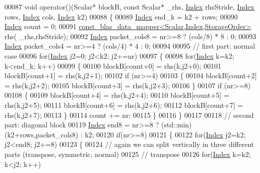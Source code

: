 \begin{DoxyCode}
00087   \textcolor{keywordtype}{void} operator()(Scalar* blockB, \textcolor{keyword}{const} Scalar* \_rhs, \hyperlink{namespace_eigen_a62e77e0933482dafde8fe197d9a2cfde}{Index} rhsStride, 
      \hyperlink{namespace_eigen_a62e77e0933482dafde8fe197d9a2cfde}{Index} rows, \hyperlink{namespace_eigen_a62e77e0933482dafde8fe197d9a2cfde}{Index} cols, \hyperlink{namespace_eigen_a62e77e0933482dafde8fe197d9a2cfde}{Index} k2)
00088   \{
00089     \hyperlink{namespace_eigen_a62e77e0933482dafde8fe197d9a2cfde}{Index} end\_k = k2 + rows;
00090     \hyperlink{namespace_eigen_a62e77e0933482dafde8fe197d9a2cfde}{Index} count = 0;
00091     \hyperlink{class_eigen_1_1internal_1_1const__blas__data__mapper}{const\_blas\_data\_mapper<Scalar,Index,StorageOrder>} rhs(
      \_rhs,rhsStride);
00092     \hyperlink{namespace_eigen_a62e77e0933482dafde8fe197d9a2cfde}{Index} packet\_cols8 = nr>=8 ? (cols/8) * 8 : 0;
00093     \hyperlink{namespace_eigen_a62e77e0933482dafde8fe197d9a2cfde}{Index} packet\_cols4 = nr>=4 ? (cols/4) * 4 : 0;
00094 
00095     \textcolor{comment}{// first part: normal case}
00096     \textcolor{keywordflow}{for}(\hyperlink{namespace_eigen_a62e77e0933482dafde8fe197d9a2cfde}{Index} j2=0; j2<k2; j2+=nr)
00097     \{
00098       \textcolor{keywordflow}{for}(\hyperlink{namespace_eigen_a62e77e0933482dafde8fe197d9a2cfde}{Index} k=k2; k<end\_k; k++)
00099       \{
00100         blockB[count+0] = rhs(k,j2+0);
00101         blockB[count+1] = rhs(k,j2+1);
00102         \textcolor{keywordflow}{if} (nr>=4)
00103         \{
00104           blockB[count+2] = rhs(k,j2+2);
00105           blockB[count+3] = rhs(k,j2+3);
00106         \}
00107         \textcolor{keywordflow}{if} (nr>=8)
00108         \{
00109           blockB[count+4] = rhs(k,j2+4);
00110           blockB[count+5] = rhs(k,j2+5);
00111           blockB[count+6] = rhs(k,j2+6);
00112           blockB[count+7] = rhs(k,j2+7);
00113         \}
00114         count += nr;
00115       \}
00116     \}
00117 
00118     \textcolor{comment}{// second part: diagonal block}
00119     \hyperlink{namespace_eigen_a62e77e0933482dafde8fe197d9a2cfde}{Index} end8 = nr>=8 ? (std::min)(k2+rows,packet\_cols8) : k2;
00120     \textcolor{keywordflow}{if}(nr>=8)
00121     \{
00122       \textcolor{keywordflow}{for}(\hyperlink{namespace_eigen_a62e77e0933482dafde8fe197d9a2cfde}{Index} j2=k2; j2<end8; j2+=8)
00123       \{
00124         \textcolor{comment}{// again we can split vertically in three different parts (transpose, symmetric, normal)}
00125         \textcolor{comment}{// transpose}
00126         \textcolor{keywordflow}{for}(\hyperlink{namespace_eigen_a62e77e0933482dafde8fe197d9a2cfde}{Index} k=k2; k<j2; k++)

\end{DoxyCode}
